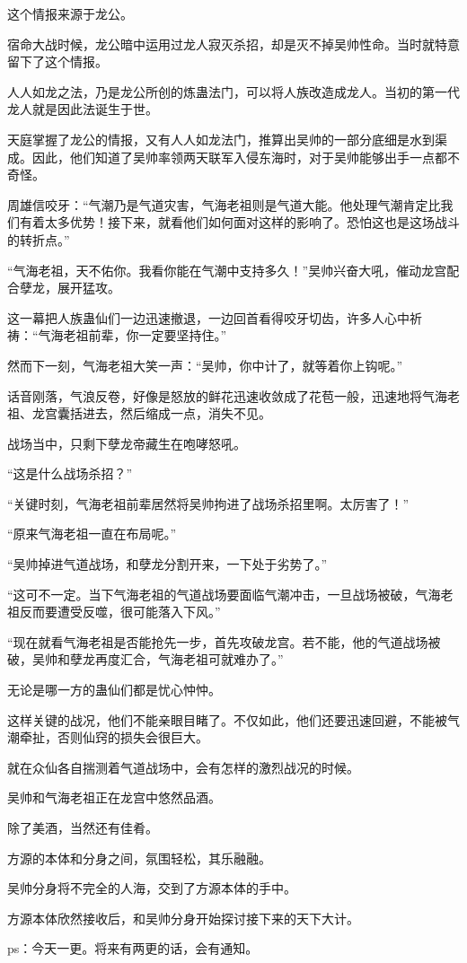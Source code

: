 \begin{this_body}
这个情报来源于龙公。

宿命大战时候，龙公暗中运用过龙人寂灭杀招，却是灭不掉吴帅性命。当时就特意留下了这个情报。

人人如龙之法，乃是龙公所创的炼蛊法门，可以将人族改造成龙人。当初的第一代龙人就是因此法诞生于世。

天庭掌握了龙公的情报，又有人人如龙法门，推算出吴帅的一部分底细是水到渠成。因此，他们知道了吴帅率领两天联军入侵东海时，对于吴帅能够出手一点都不奇怪。

周雄信咬牙：“气潮乃是气道灾害，气海老祖则是气道大能。他处理气潮肯定比我们有着太多优势！接下来，就看他们如何面对这样的影响了。恐怕这也是这场战斗的转折点。”

“气海老祖，天不佑你。我看你能在气潮中支持多久！”吴帅兴奋大吼，催动龙宫配合孽龙，展开猛攻。

这一幕把人族蛊仙们一边迅速撤退，一边回首看得咬牙切齿，许多人心中祈祷：“气海老祖前辈，你一定要坚持住。”

然而下一刻，气海老祖大笑一声：“吴帅，你中计了，就等着你上钩呢。”

话音刚落，气浪反卷，好像是怒放的鲜花迅速收敛成了花苞一般，迅速地将气海老祖、龙宫囊括进去，然后缩成一点，消失不见。

战场当中，只剩下孽龙帝藏生在咆哮怒吼。

“这是什么战场杀招？”

“关键时刻，气海老祖前辈居然将吴帅拘进了战场杀招里啊。太厉害了！”

“原来气海老祖一直在布局呢。”

“吴帅掉进气道战场，和孽龙分割开来，一下处于劣势了。”

“这可不一定。当下气海老祖的气道战场要面临气潮冲击，一旦战场被破，气海老祖反而要遭受反噬，很可能落入下风。”

“现在就看气海老祖是否能抢先一步，首先攻破龙宫。若不能，他的气道战场被破，吴帅和孽龙再度汇合，气海老祖可就难办了。”

无论是哪一方的蛊仙们都是忧心忡忡。

这样关键的战况，他们不能亲眼目睹了。不仅如此，他们还要迅速回避，不能被气潮牵扯，否则仙窍的损失会很巨大。

就在众仙各自揣测着气道战场中，会有怎样的激烈战况的时候。

吴帅和气海老祖正在龙宫中悠然品酒。

除了美酒，当然还有佳肴。

方源的本体和分身之间，氛围轻松，其乐融融。

吴帅分身将不完全的人海，交到了方源本体的手中。

方源本体欣然接收后，和吴帅分身开始探讨接下来的天下大计。

ps：今天一更。将来有两更的话，会有通知。

\end{this_body}

